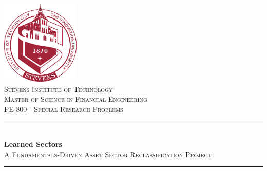 \begin{titlepage}


\newcommand{\HRule}{\rule{\linewidth}{0.5mm}} %

\begin{center}



\includegraphics[height=4cm]{resources/stevens_seal.png}\\[1cm] %

\textsc{\LARGE Stevens Institute of Technology}
\\[0.5cm]
\textsc{\Large Master of Science in Financial Engineering}
\\[0.5cm]
\textsc{\large FE 800 - Special Research Problems}\\[3cm]




\HRule \\[0.9cm]
{\huge \bfseries Learned Sectors}\\[0.4cm] %
\textsc{\Large A Fundamentals-Driven Asset Sector Reclassification Project}\\[0.5cm] %
\HRule \\[1.5cm]



\end{center}
\end{titlepage}
